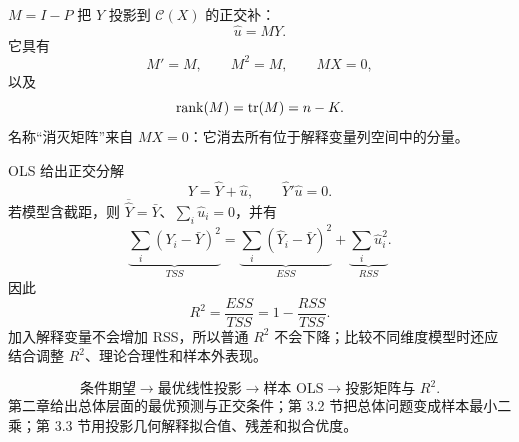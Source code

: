 \begin{proposition}\label{hw:reg:note:3:8}
$M=I-P$ 把 $Y$ 投影到 $\mathcal C(X)$ 的正交补：
\[
\widehat u=MY.
\]
它具有
\[
M'=M,\qquad M^2=M,\qquad MX=0,
\]
以及
\[
\operatorname{rank}(M)=\operatorname{tr}(M)=n-K.
\]
名称“消灭矩阵”来自 $MX=0$：它消去所有位于解释变量列空间中的分量。
\end{proposition}

\begin{proposition}\label{hw:reg:note:3:9}
OLS 给出正交分解
\[
Y=\widehat Y+\widehat u,\qquad
\widehat Y'\widehat u=0.
\]
若模型含截距，则 $\overline{\widehat Y}=\bar Y$、$\sum_i\widehat u_i=0$，并有
\[
\underbrace{\sum_i(Y_i-\bar Y)^2}_{TSS}
=
\underbrace{\sum_i(\widehat Y_i-\bar Y)^2}_{ESS}
+
\underbrace{\sum_i\widehat u_i^2}_{RSS}.
\]
因此
\[
R^2=\frac{ESS}{TSS}=1-\frac{RSS}{TSS}.
\]
加入解释变量不会增加 RSS，所以普通 $R^2$ 不会下降；比较不同维度模型时还应结合调整 $R^2$、理论合理性和样本外表现。
\end{proposition}

\begin{proposition}\label{hw:reg:note:3:10}
\[
\text{条件期望}
\longrightarrow
\text{最优线性投影}
\longrightarrow
\text{样本 OLS}
\longrightarrow
\text{投影矩阵与 }R^2.
\]
第二章给出总体层面的最优预测与正交条件；第 3.2 节把总体问题变成样本最小二乘；第 3.3 节用投影几何解释拟合值、残差和拟合优度。
\end{proposition}


\endgroup
